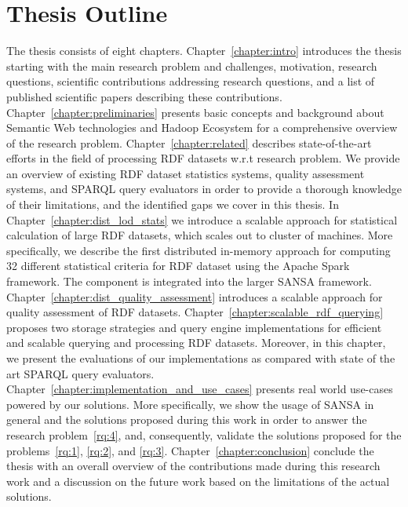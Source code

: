 \section{Thesis Outline}
\label{sec:thesis-outline}
The thesis consists of eight chapters.
Chapter~\ref{chapter:intro} introduces the thesis starting with the main research problem and challenges, motivation, research questions, scientific contributions addressing research questions, and a list of published scientific papers describing these contributions.
Chapter~\ref{chapter:preliminaries} presents basic concepts and background about Semantic Web technologies and Hadoop Ecosystem for a comprehensive overview of the research problem. 
Chapter~\ref{chapter:related} describes state-of-the-art efforts in the field of processing \gls{RDF} datasets w.r.t research problem.
We provide an overview of existing RDF dataset statistics systems, quality assessment systems, and SPARQL query evaluators in order to provide a thorough knowledge of their limitations, and the identified gaps we cover in this thesis.
In Chapter~\ref{chapter:dist_lod_stats} we introduce a scalable approach for statistical calculation of large \gls{RDF} datasets, which scales out to cluster of machines.
More specifically, we describe the first distributed in-memory approach for computing 32 different statistical criteria for \gls{RDF} dataset using the Apache Spark framework.
The component is integrated into the larger SANSA framework.
Chapter~\ref{chapter:dist_quality_assessment} introduces a scalable approach for quality assessment of RDF datasets.
Chapter~\ref{chapter:scalable_rdf_querying} proposes two storage strategies and query engine implementations for efficient and scalable querying and processing RDF datasets. 
Moreover, in this chapter, we present the evaluations of our implementations as compared with state of the art SPARQL query evaluators.
Chapter~\ref{chapter:implementation_and_use_cases} presents real world use-cases powered by our solutions. 
More specifically, we show the usage of SANSA in general and the solutions proposed during this work in order to answer the research problem~\ref{rq:4}, and, consequently, validate the solutions proposed for the problems~\ref{rq:1}, \ref{rq:2}, and \ref{rq:3}.
Chapter~\ref{chapter:conclusion} conclude the thesis with an overall overview of the contributions made during this research work and a discussion on the future work based on the limitations of the actual solutions. 
